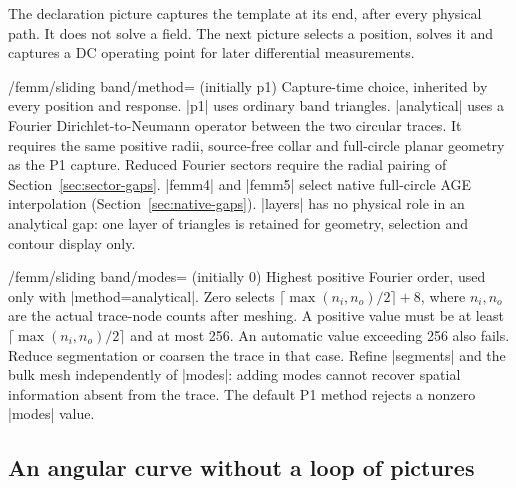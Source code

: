 The declaration picture captures the template at its end, after every physical
path. It does not solve a field. The next picture selects a position, solves it
and captures a DC operating point for later differential measurements.

\begin{codeexample}[width=6cm]
\end{codeexample}

\begin{key}{/femm/sliding band/method= (initially p1)}
  Capture-time choice, inherited by every position and response. |p1| uses
  ordinary band triangles. |analytical| uses a Fourier Dirichlet-to-Neumann
  operator between the two circular traces. It requires the same positive
  radii, source-free collar and full-circle planar geometry as the P1 capture.
  Reduced Fourier sectors require the radial pairing of Section~\ref{sec:sector-gaps}.
  |femm4| and |femm5| select native full-circle AGE interpolation
  (Section~\ref{sec:native-gaps}).
  |layers| has no physical role in an analytical gap: one layer of triangles
  is retained for geometry, selection and contour display only.
\end{key}
\begin{key}{/femm/sliding band/modes= (initially 0)}
  Highest positive Fourier order, used only with |method=analytical|.
  Zero selects $\lceil\max(n_i,n_o)/2\rceil+8$, where $n_i,n_o$ are the actual
  trace-node counts after meshing. A positive value must be at least
  $\lceil\max(n_i,n_o)/2\rceil$ and at most 256. An automatic value exceeding
  256 also fails. Reduce segmentation or coarsen the trace in that case.
  Refine |segments| and the bulk mesh independently of |modes|: adding modes
  cannot recover spatial information absent from the trace. The default P1
  method rejects a nonzero |modes| value.
\end{key}

\subsection{An angular curve without a loop of pictures}

